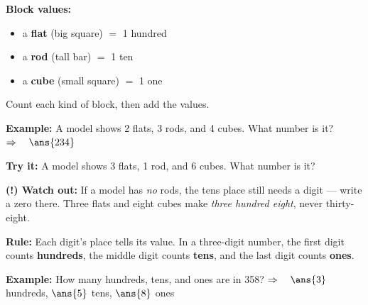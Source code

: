 \documentclass[12pt]{article}
\begin{document}


\begin{formulabox}
\textbf{Block values:}
\begin{itemize}[leftmargin=1.2cm, itemsep=1pt, topsep=2pt]
  \item a \textbf{flat} (big square) $=$ 1 hundred
  \item a \textbf{rod} (tall bar) $=$ 1 ten
  \item a \textbf{cube} (small square) $=$ 1 one
\end{itemize}
Count each kind of block, then add the values.
\end{formulabox}

\begin{examplebox}
\textbf{Example:} \quad A model shows 2 flats, 3 rods, and 4 cubes. What number is it?
$\Rightarrow\quad \ans{234}$
\end{examplebox}

\begin{tryitbox}
\textbf{Try it:} \quad A model shows 3 flats, 1 rod, and 6 cubes. What number is it?\\[2pt]
\end{tryitbox}

\begin{watchoutbox}
\textbf{(!) Watch out:} If a model has \emph{no} rods, the tens place still
needs a digit --- write a zero there. Three flats and eight cubes make
\emph{three hundred eight}, never thirty-eight.
\end{watchoutbox}


\begin{formulabox}
\textbf{Rule:} Each digit's place tells its value.
In a three-digit number, the first digit counts \textbf{hundreds}, the middle
digit counts \textbf{tens}, and the last digit counts \textbf{ones}.
\end{formulabox}

\begin{examplebox}
\textbf{Example:} \quad How many hundreds, tens, and ones are in 358?
$\Rightarrow\quad \ans{3}$ hundreds, $\ans{5}$ tens, $\ans{8}$ ones
\end{examplebox}
\end{document}
